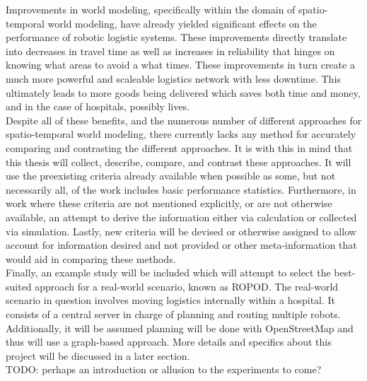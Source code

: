 Improvements in world modeling, specifically within the domain of
spatio-temporal world modeling, have already yielded significant effects
on the performance of robotic logistic systems. These improvements directly
translate into decreases in travel time as well as increases in reliability
that hinges on knowing what areas to avoid a what times. These improvements in
turn create a much more powerful and scaleable logistics network with less
downtime. This ultimately leads to more goods being delivered which saves
both time and money, and in the case of hospitals, possibly lives. \\

Despite all of these benefits, and the numerous number of different approaches
for spatio-temporal world modeling, there currently lacks any method for
accurately comparing and contrasting the different approaches. It is with this
in mind that this thesis will collect, describe, compare, and contrast these
approaches.  It will use the preexisting criteria already available when possible as some,
but not necessarily all, of the work includes basic performance statistics.
Furthermore, in work where these criteria are not mentioned explicitly, or are
not otherwise available, an attempt to derive the information either via
calculation or collected via simulation. Lastly, new criteria will be devised
or otherwise assigned to allow account for information desired and not provided
or other meta-information that would aid in comparing these methods. \\

Finally, an example study will be included which will attempt to select the
best-suited approach for a real-world scenario, known as ROPOD. The real-world
scenario in question involves moving logistics internally within a hospital.
It consists of a central server in charge of planning and routing multiple
robots.  Additionally, it will be assumed planning will be done with
OpenStreetMap and thus will use a graph-based approach. More details and
specifics about this project will be discussed in a later section. \\


TODO: perhaps an introduction or allusion to the experiments to come?

